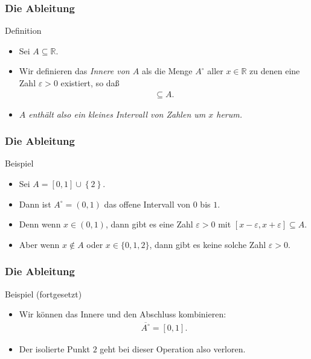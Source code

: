 \documentclass{beamer}
\renewcommand{\emph}[1]{{\textcolor{solarizedRed}{\itshape #1}}}
\newcommand\RR{\mathbb R}
\newcommand{\eps}{\varepsilon}
\newcommand\cbc[1]{\left\{{#1}\right\}}
\renewcommand{\ae}{\"a}
\renewcommand{\oe}{\"o}
\newcommand{\mytitle}{Die Ableitung}
\begin{document}
\begin{frame}\frametitle{\mytitle}
	\begin{block}{Definition}
		\begin{itemize}
			\item Sei $A\subseteq\RR$.
			\item Wir definieren das \emph{Innere von $A$} als die Menge $A^\circ$ aller $x\in\RR$ zu denen eine Zahl $\eps>0$ existiert, so da\ss\
				\begin{align*}
					[x-\eps,x+\eps]\subseteq A.
				\end{align*}
			\item {\itshape $A$ enth\ae lt also ein kleines Intervall von Zahlen um $x$ herum.}
		\end{itemize}
	\end{block}
\end{frame}

\begin{frame}\frametitle{\mytitle}
	\begin{block}{Beispiel}
		\begin{itemize}
			\item Sei $A=[0,1]\cup\cbc{2}$.
			\item Dann ist $A^\circ=(0,1)$ das offene Intervall von $0$ bis $1$.
			\item Denn wenn $x\in(0,1)$, dann gibt es eine Zahl $\eps>0$ mit $[x-\eps,x+\eps]\subseteq A$.
			\item Aber wenn $x\not\in A$ oder $x\in\{0,1,2\}$, dann gibt es keine solche Zahl $\eps>0$.
		\end{itemize}
	\end{block}
\end{frame}

\begin{frame}\frametitle{\mytitle}
	\begin{block}{Beispiel (fortgesetzt)}
		\begin{itemize}
			\item Wir k\oe nnen das Innere und den Abschluss kombinieren:
				\begin{align*}
					\overline{A^\circ}=[0,1].
				\end{align*}
			\item Der isolierte Punkt $2$ geht bei dieser Operation also verloren.
		\end{itemize}
	\end{block}
\end{frame}
\end{document}
